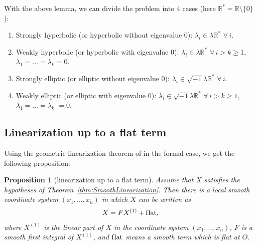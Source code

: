 \documentclass[pdftex]{sigma}
\numberwithin{equation}{section}
\newtheorem{prop}[thm]{Proposition}
 { \theoremstyle{definition}
\newtheorem{Remark}[thm]{Remark} }
\newcommand{\bbR}{\mathbb R}
\begin{document}
With the above lemma, we can divide the problem into 4 cases (here $\bbR^* = \bbR \setminus \{0\}$):
\begin{enumerate}\itemsep=0pt
\item[I.] Strongly hyperbolic (or hyperbolic without eigenvalue 0): $\lambda_i \in \lambda\bbR^*$ $\forall\, i$.
\item[II.] Weakly hyperbolic (or hyperbolic with eigenvalue 0): $\lambda_i \in \lambda\bbR^* $ $\forall\, i > k \geq 1$,
$\lambda_1 = \dots = \lambda_k = 0$.
\item[III.] Strongly elliptic (or elliptic without eigenvalue 0): $\lambda_i \in \sqrt{-1}\lambda\bbR^*$ $\forall\, i$.
\item[IV.] Weakly elliptic (or elliptic with eigenvalue 0): $\lambda_i \in \sqrt{-1}\lambda\bbR^*$ $\forall\, i > k \geq 1$,
$\lambda_1 = \dots = \lambda_k$ $= 0$.
\end{enumerate}

\subsection{Linearization up to a f\/lat term} Using the geometric linearization theorem of \cite{Zung-Nondegenerate2015}
in the formal case, we get the following proposition:

\begin{prop}[linearization up to a f\/lat term] \label{prop:LinearizationUpToFlat}
 Assume that $X$ satisfies the hypotheses of Theorem~{\rm \ref{thm:SmoothLinearization}}. Then there is a local smooth
coordinate system $(x_1,\dots,x_n)$ in which $X$ can be written as
\begin{gather*}
X = FX^{(1)} + \text{\rm f\/lat},
\end{gather*}
where $X^{(1)}$ is the linear part of $X$ in the coordinate system $(x_1,\dots,x_n)$,
$F$ is a smooth first integral of $X^{(1)}$, and $\text{\rm f\/lat}$ means a smooth term which is flat at $O$.
\end{prop}
\end{document}
